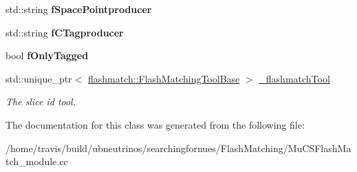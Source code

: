\begin{DoxyCompactItemize}
\item 
std\+::string {\bfseries f\+Space\+Pointproducer}\hypertarget{classMuCSFlashMatch_a72e882170ac31de572a22fec62b2c92f}{}\label{classMuCSFlashMatch_a72e882170ac31de572a22fec62b2c92f}

\item 
std\+::string {\bfseries f\+C\+Tagproducer}\hypertarget{classMuCSFlashMatch_ad581a60155500fe7ddd4c66242575d52}{}\label{classMuCSFlashMatch_ad581a60155500fe7ddd4c66242575d52}

\item 
bool {\bfseries f\+Only\+Tagged}\hypertarget{classMuCSFlashMatch_ac8212264ca73cfbbb95e8357dce03393}{}\label{classMuCSFlashMatch_ac8212264ca73cfbbb95e8357dce03393}

\item 
std\+::unique\+\_\+ptr$<$ \hyperlink{classflashmatch_1_1FlashMatchingToolBase}{flashmatch\+::\+Flash\+Matching\+Tool\+Base} $>$ \hyperlink{classMuCSFlashMatch_ac7d7c6f36ada7a806d24854f30e68c54}{\+\_\+flashmatch\+Tool}\hypertarget{classMuCSFlashMatch_ac7d7c6f36ada7a806d24854f30e68c54}{}\label{classMuCSFlashMatch_ac7d7c6f36ada7a806d24854f30e68c54}

\begin{DoxyCompactList}\small\item\em The slice id tool. \end{DoxyCompactList}\end{DoxyCompactItemize}


The documentation for this class was generated from the following file\+:\begin{DoxyCompactItemize}
\item 
/home/travis/build/ubneutrinos/searchingfornues/\+Flash\+Matching/Mu\+C\+S\+Flash\+Match\+\_\+module.\+cc\end{DoxyCompactItemize}
